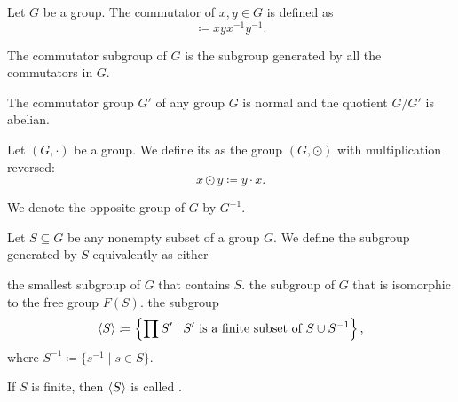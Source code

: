 \begin{definition}\label{def:group_commutator}
  Let \( G \) be a group. The commutator of \( x, y \in G \) is defined as
  \begin{equation*}
    [x, y] \coloneqq xyx^{-1}y^{-1}.
  \end{equation*}

  The commutator subgroup of \( G \) is the subgroup generated by all the commutators in \( G \).
\end{definition}

\begin{proposition}\label{thm:quotient_by_commutator_subgroup}\cite[proposition 7.4]{Knapp2016BAlg}
  The commutator group \( G' \) of any group \( G \) is normal and the quotient \( G / G' \) is abelian.
\end{proposition}

\begin{definition}\label{def:opposite_group}
  Let \( (G, \cdot) \) be a group. We define its  as the group \( (G, \odot) \) with multiplication reversed:
  \begin{equation*}
    x \odot y \coloneqq y \cdot x.
  \end{equation*}

  We denote the opposite group of \( G \) by \( G^{-1} \).
\end{definition}

\begin{definition}\label{def:generated_subgroup}
  Let \( S \subseteq G \) be any nonempty subset of a group \( G \). We define the subgroup generated by \( S \) equivalently as either
  \begin{defenum}
     the smallest subgroup of \( G \) that contains \( S \).
     the subgroup of \( G \) that is isomorphic to the free group \( F(S) \).
     the subgroup
    \begin{equation*}
      \left\langle S \right\rangle \coloneqq \left\{ \prod S' \mid S' \text{ is a finite subset of } S \cup S^{-1} \right\},
    \end{equation*}
    where \( S^{-1} \coloneqq \{ s^{-1} \mid s \in S \} \).
  \end{defenum}

  If \( S \) is finite, then \( \left\langle S \right\rangle \) is called .
\end{definition}
